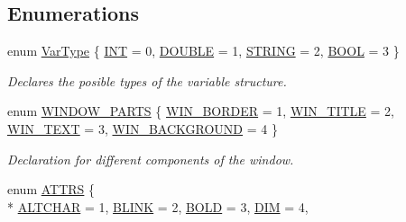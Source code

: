 \subsection*{Enumerations}
\begin{DoxyCompactItemize}
\item 
enum \hyperlink{namespaceostendo_ae78fb0e171a88eb8820d8d6a894463f4}{Var\+Type} \{ \hyperlink{namespaceostendo_ae78fb0e171a88eb8820d8d6a894463f4ab2b3795a506a3e38b4c00c96b9193b81}{I\+NT} = 0, 
\hyperlink{namespaceostendo_ae78fb0e171a88eb8820d8d6a894463f4a62b746a7f8691e7b0010c7c78cc3714b}{D\+O\+U\+B\+LE} = 1, 
\hyperlink{namespaceostendo_ae78fb0e171a88eb8820d8d6a894463f4a26583ec8ca995b14e769c98e6025bbb3}{S\+T\+R\+I\+NG} = 2, 
\hyperlink{namespaceostendo_ae78fb0e171a88eb8820d8d6a894463f4a8c79b343b56c9861211e496c7276fb64}{B\+O\+OL} = 3
 \}\begin{DoxyCompactList}\small\item\em Declares the posible types of the variable structure. \end{DoxyCompactList}
\item 
enum \hyperlink{namespaceostendo_aa031b855a10fa72d112d6b7287c8f2ec}{W\+I\+N\+D\+O\+W\+\_\+\+P\+A\+R\+TS} \{ \hyperlink{namespaceostendo_aa031b855a10fa72d112d6b7287c8f2eca26a94c1892f3cbff5ab7e6d31b5cb77c}{W\+I\+N\+\_\+\+B\+O\+R\+D\+ER} = 1, 
\hyperlink{namespaceostendo_aa031b855a10fa72d112d6b7287c8f2eca9c4bc15f158c6523e71a9a66b020fbab}{W\+I\+N\+\_\+\+T\+I\+T\+LE} = 2, 
\hyperlink{namespaceostendo_aa031b855a10fa72d112d6b7287c8f2eca177402ad0ac6b02593972fedbc58020e}{W\+I\+N\+\_\+\+T\+E\+XT} = 3, 
\hyperlink{namespaceostendo_aa031b855a10fa72d112d6b7287c8f2ecac01b3c91073d3e21325cc8a082cd7baa}{W\+I\+N\+\_\+\+B\+A\+C\+K\+G\+R\+O\+U\+ND} = 4
 \}\begin{DoxyCompactList}\small\item\em Declaration for different components of the window. \end{DoxyCompactList}
\item 
enum \hyperlink{namespaceostendo_a804202ffcab31ce4e007ff0c9d5249c6}{A\+T\+T\+RS} \{ \\*
\hyperlink{namespaceostendo_a804202ffcab31ce4e007ff0c9d5249c6aaf0b8945bf817b057d16dabd79fdbf05}{A\+L\+T\+C\+H\+AR} = 1, 
\hyperlink{namespaceostendo_a804202ffcab31ce4e007ff0c9d5249c6a0ad98e6d41bc73832fa0cec6194d02d3}{B\+L\+I\+NK} = 2, 
\hyperlink{namespaceostendo_a804202ffcab31ce4e007ff0c9d5249c6a434b908118752e03181b584a12f497fc}{B\+O\+LD} = 3, 
\hyperlink{namespaceostendo_a804202ffcab31ce4e007ff0c9d5249c6a6e9f2e6ee917da1f2ebfa80cf004c442}{D\+IM} = 4, 

\end{DoxyCompactItemize}
